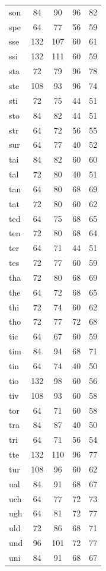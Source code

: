 \documentclass[ms,electronic,twosidetoc,letterpaper,chaptercenter,parttop,lof,lot]{byumsphd}
\begin{document}
\begin{longtable}{| l | c c | c c |}
  son & 84 & 90 & 96 & 82 \\
  spe & 64 & 77 & 56 & 59 \\
  sse & 132 & 107 & 60 & 61 \\
  ssi & 132 & 111 & 60 & 59 \\
  sta & 72 & 79 & 96 & 78 \\
  ste & 108 & 93 & 96 & 74 \\
  sti & 72 & 75 & 44 & 51 \\
  sto & 84 & 82 & 44 & 51 \\
  str & 64 & 72 & 56 & 55 \\
  sur & 64 & 77 & 40 & 52 \\
  tai & 84 & 82 & 60 & 60 \\
  tal & 72 & 80 & 40 & 51 \\
  tan & 64 & 80 & 68 & 69 \\
  tat & 72 & 80 & 60 & 62 \\
  ted & 64 & 75 & 68 & 65 \\
  ten & 72 & 80 & 68 & 64 \\
  ter & 64 & 71 & 44 & 51 \\
  tes & 72 & 77 & 60 & 59 \\
  tha & 72 & 80 & 68 & 69 \\
  the & 64 & 72 & 68 & 65 \\
  thi & 72 & 74 & 60 & 62 \\
  tho & 72 & 77 & 72 & 68 \\
  tic & 64 & 67 & 60 & 59 \\
  tim & 84 & 94 & 68 & 71 \\
  tin & 64 & 74 & 40 & 50 \\
  tio & 132 & 98 & 60 & 56 \\
  tiv & 108 & 93 & 60 & 58 \\
  tor & 64 & 71 & 60 & 58 \\
  tra & 84 & 87 & 40 & 50 \\
  tri & 64 & 71 & 56 & 54 \\
  tte & 132 & 110 & 96 & 77 \\
  tur & 108 & 96 & 60 & 62 \\
  ual & 84 & 91 & 68 & 67 \\
  uch & 64 & 77 & 72 & 73 \\
  ugh & 64 & 81 & 72 & 77 \\
  uld & 72 & 86 & 68 & 71 \\
  und & 96 & 101 & 72 & 77 \\
  uni & 84 & 91 & 68 & 67 \\

\end{longtable}
\end{document}
